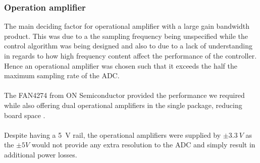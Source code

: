 \subsubsection{Operation amplifier}
The main deciding factor for operational amplifier with a large gain bandwidth product. This was due to a the sampling frequency being unspecified while the control algorithm was being designed and also to due to a lack of understanding in regards to how high frequency content affect the performance of the controller. Hence an operational amplifier was chosen such that it exceeds the half the maximum sampling rate of the ADC.
\\ \\
The FAN4274 from ON Semiconductor provided the performance we required while also offering dual operational amplifiers in the single package, reducing board space \cite{fan4274}.
\\ \\
Despite having a \SI{5}{V} rail, the operational amplifiers were supplied by $\pm\SI{3.3}{V}$ as the $\pm{5}{V}$ would not provide any extra resolution to the ADC and simply result in additional power losses.